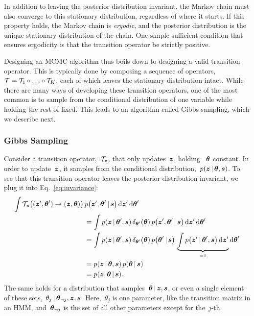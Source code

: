 In addition to leaving the posterior distribution invariant, the
Markov chain must also converge to this stationary distribution,
regardless of where it starts. If this property holds, the Markov
chain is \emph{ergodic}, and the posterior distribution is the unique
stationary distribution of the chain. One simple sufficient condition
that ensures ergodicity is that the transition operator be strictly
positive.

Designing an MCMC algorithm thus boils down to designing a valid
transition operator. This is typically done by composing a sequence of
operators,~${\mathcal{T} = \mathcal{T}_1 \circ \ldots \circ \mathcal{T}_K}$, each of which
leaves the stationary distribution intact. While there are many ways
of developing these transition operators, one of the most common 
is to sample from the conditional distribution of one variable 
while holding the rest of fixed. This leads to an algorithm called 
Gibbs sampling, which we describe next.

\subsubsection{Gibbs Sampling}
Consider a transition operator,~$\mathcal{T}_{\boldsymbol{z}}$, that only updates~$\boldsymbol{z}$,
holding ~$\boldsymbol{\theta}$ constant. In order to update~$\boldsymbol{z}$, it samples from
the conditional distribution,~$p(\boldsymbol{z} \,|\, \boldsymbol{\theta}, \boldsymbol{s})$. To see
that this transition operator leaves the posterior distribution
invariant, we plug it into Eq.~\ref{eq:invariance}:
\begin{align*}
  \int \mathcal{T}_{\boldsymbol{z}} \big((\boldsymbol{z}', \boldsymbol{\theta}') \to (\boldsymbol{z}, \boldsymbol{\theta}) \big) \, 
    &p \big(\boldsymbol{z}', \boldsymbol{\theta}' \,|\, \boldsymbol{s} \big) \, 
    \mathrm{d}\boldsymbol{z}' \, \mathrm{d}\boldsymbol{\theta}' \\
  &= \int p(\boldsymbol{z} \,|\, \boldsymbol{\theta}', \boldsymbol{s}) \, \delta_{\boldsymbol{\theta}'}(\boldsymbol{\theta}) \,
    p \big(\boldsymbol{z}', \boldsymbol{\theta}' \,|\, \boldsymbol{s} \big) \, 
    \mathrm{d}\boldsymbol{z}' \, \mathrm{d}\boldsymbol{\theta}' \\
  &= 
  \int p(\boldsymbol{z} \,|\, \boldsymbol{\theta}', \boldsymbol{s}) \, \delta_{\boldsymbol{\theta}'}(\boldsymbol{\theta}) \,
    p \big(\boldsymbol{\theta}' \,|\, \boldsymbol{s} \big) \,
     \underbrace{\int
    p \big(\boldsymbol{z}' \,|\, \boldsymbol{\theta}', \boldsymbol{s} \big) \, 
    \mathrm{d}\boldsymbol{z}'}_{=1}  \mathrm{d}\boldsymbol{\theta}' \\
  &= p(\boldsymbol{z} \,|\, \boldsymbol{\theta}, \boldsymbol{s}) \, p(\boldsymbol{\theta} \,|\, \boldsymbol{s}) \\
  &= p(\boldsymbol{z}, \boldsymbol{\theta} \,|\, \boldsymbol{s}).
\end{align*}
The same holds for a distribution that
samples~${\boldsymbol{\theta} \,|\, \boldsymbol{z}, \boldsymbol{s}}$, or even a single element of these
sets,~${\theta_j \,|\, \boldsymbol{\theta}_{\neg j}, \boldsymbol{z}, \boldsymbol{s}}$.
Here,~$\theta_j$ is one parameter, like the transition matrix in an
HMM, and~$\boldsymbol{\theta}_{\neg j}$ is the set of all other parameters except
for the~$j$-th.

